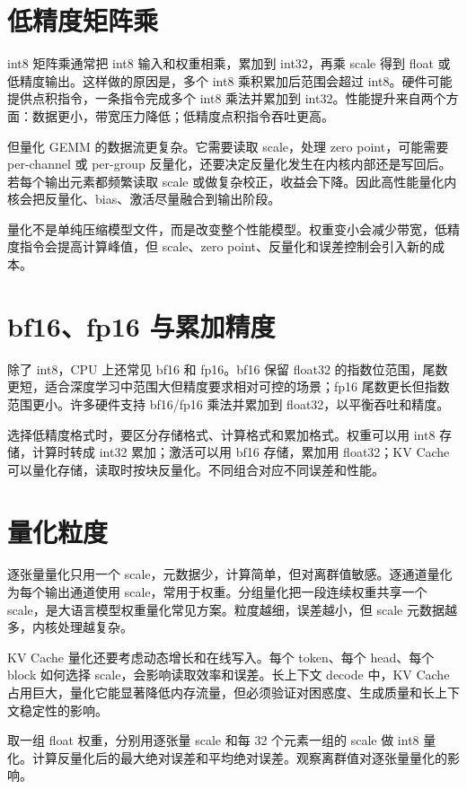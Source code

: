 \section{低精度矩阵乘}

int8 矩阵乘通常把 int8 输入和权重相乘，累加到 int32，再乘 scale 得到 float 或低精度输出。这样做的原因是，多个 int8 乘积累加后范围会超过 int8。硬件可能提供点积指令，一条指令完成多个 int8 乘法并累加到 int32。性能提升来自两个方面：数据更小，带宽压力降低；低精度点积指令吞吐更高。

但量化 GEMM 的数据流更复杂。它需要读取 scale，处理 zero point，可能需要 per-channel 或 per-group 反量化，还要决定反量化发生在内核内部还是写回后。若每个输出元素都频繁读取 scale 或做复杂校正，收益会下降。因此高性能量化内核会把反量化、bias、激活尽量融合到输出阶段。

\begin{keyidea}
量化不是单纯压缩模型文件，而是改变整个性能模型。权重变小会减少带宽，低精度指令会提高计算峰值，但 scale、zero point、反量化和误差控制会引入新的成本。
\end{keyidea}

\section{bf16、fp16 与累加精度}

除了 int8，CPU 上还常见 bf16 和 fp16。bf16 保留 float32 的指数位范围，尾数更短，适合深度学习中范围大但精度要求相对可控的场景；fp16 尾数更长但指数范围更小。许多硬件支持 bf16/fp16 乘法并累加到 float32，以平衡吞吐和精度。

选择低精度格式时，要区分存储格式、计算格式和累加格式。权重可以用 int8 存储，计算时转成 int32 累加；激活可以用 bf16 存储，累加用 float32；KV Cache 可以量化存储，读取时按块反量化。不同组合对应不同误差和性能。

\section{量化粒度}

逐张量量化只用一个 scale，元数据少，计算简单，但对离群值敏感。逐通道量化为每个输出通道使用 scale，常用于权重。分组量化把一段连续权重共享一个 scale，是大语言模型权重量化常见方案。粒度越细，误差越小，但 scale 元数据越多，内核处理越复杂。

KV Cache 量化还要考虑动态增长和在线写入。每个 token、每个 head、每个 block 如何选择 scale，会影响读取效率和误差。长上下文 decode 中，KV Cache 占用巨大，量化它能显著降低内存流量，但必须验证对困惑度、生成质量和长上下文稳定性的影响。

\begin{exercisebox}
取一组 float 权重，分别用逐张量 scale 和每 32 个元素一组的 scale 做 int8 量化。计算反量化后的最大绝对误差和平均绝对误差。观察离群值对逐张量量化的影响。
\end{exercisebox}
